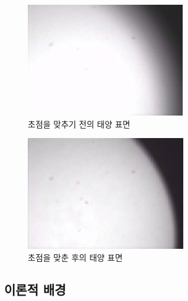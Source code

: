 \documentclass{abstract_hutech}
\begin{document}
\begin{figure}[h]
\centering
\includegraphics[width=0.8\linewidth]{before}
\caption{초점을 맞추기 전의 태양 표면}
\label{fig:before}
\end{figure}

\begin{figure}[h]
\centering
\includegraphics[width=0.8\linewidth]{after}
\caption{초점을 맞춘 후의 태양 표면}
\label{fig:after}
\end{figure}



\subsection{이론적 배경}
\end{document}
